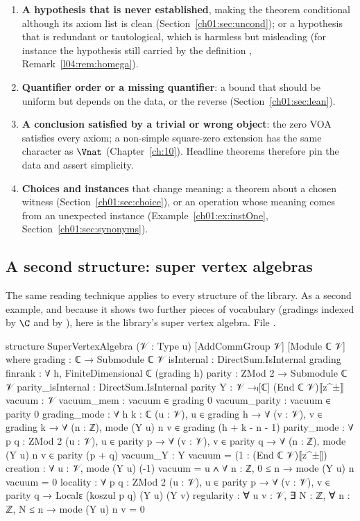 \begin{enumerate}[label=(F\arabic*)]
  Section~\ref{ch01:sec:junk}.
\item \textbf{A hypothesis that is never established}, making the theorem conditional although its
  axiom list is clean (Section~\ref{ch01:sec:uncond}); or a hypothesis that is redundant or
  tautological, which is harmless but misleading (for instance the hypothesis  still carried by the definition , Remark~\ref{l04:rem:homega}).
\item \textbf{Quantifier order or a missing quantifier}: a bound that should be uniform but depends on
  the data, or the reverse (Section~\ref{ch01:sec:lean}).
\item \textbf{A conclusion satisfied by a trivial or wrong object}: the zero VOA satisfies every
  axiom; a non-simple square-zero extension has the same character as $\Vnat$
  (Chapter~\ref{ch:10}). Headline theorems therefore pin the data and assert simplicity.
\item \textbf{Choices and instances} that change meaning: a theorem about a chosen witness
  (Section~\ref{ch01:sec:choice}), or an operation whose meaning comes from an unexpected instance
  (Example~\ref{ch01:ex:instOne}, Section~\ref{ch01:sec:synonyms}).
\end{enumerate}

\subsection{A second structure: super vertex algebras}\label{ch01:sec:super}

The same reading technique applies to every structure of the library. As a second example, and
because it shows two further pieces of vocabulary (gradings indexed by $\C$ and by ),
here is the library's super vertex algebra.
\noindent File .
\begin{leancode}
structure SuperVertexAlgebra (𝒱 : Type u) [AddCommGroup 𝒱] [Module ℂ 𝒱] where
  grading : ℂ → Submodule ℂ 𝒱
  isInternal : DirectSum.IsInternal grading
  finrank : ∀ h, FiniteDimensional ℂ (grading h)
  parity : ZMod 2 → Submodule ℂ 𝒱
  parity_isInternal : DirectSum.IsInternal parity
  Y : 𝒱 →ₗ[ℂ] (End ℂ 𝒱)⟦z^±⟧
  vacuum : 𝒱
  vacuum_mem : vacuum ∈ grading 0
  vacuum_parity : vacuum ∈ parity 0
  grading_mode : ∀ {h k : ℂ} (u : 𝒱), u ∈ grading h → ∀ (v : 𝒱), v ∈ grading k →
    ∀ (n : ℤ), mode (Y u) n v ∈ grading (h + k - n - 1)
  parity_mode : ∀ {p q : ZMod 2} (u : 𝒱), u ∈ parity p → ∀ (v : 𝒱), v ∈ parity q →
    ∀ (n : ℤ), mode (Y u) n v ∈ parity (p + q)
  vacuum_Y : Y vacuum = (1 : (End ℂ 𝒱)⟦z^±⟧)
  creation : ∀ u : 𝒱, mode (Y u) (-1) vacuum = u ∧ ∀ n : ℤ, 0 ≤ n → mode (Y u) n vacuum = 0
  locality : ∀ {p q : ZMod 2} (u : 𝒱), u ∈ parity p → ∀ (v : 𝒱), v ∈ parity q →
    Localε (koszul p q) (Y u) (Y v)
  regularity : ∀ u v : 𝒱, ∃ N : ℤ, ∀ n : ℤ, N ≤ n → mode (Y u) n v = 0
\end{leancode}

